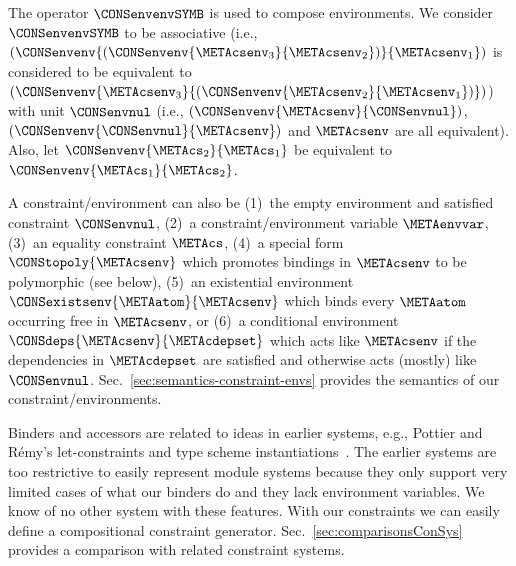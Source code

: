 \documentclass{jfp1}
\begin{document}
The operator $\CONSenvenvSYMB$ is used to compose environments.  We
consider $\CONSenvenvSYMB$ to be associative (i.e.,
$(\CONSenvenv{(\CONSenvenv{\METAcsenv_3}{\METAcsenv_2})}{\METAcsenv_1})$
is considered to be equivalent to
$(\CONSenvenv{\METAcsenv_3}{(\CONSenvenv{\METAcsenv_2}{\METAcsenv_1})})$)
with unit $\CONSenvnul$ (i.e.,
$(\CONSenvenv{\METAcsenv}{\CONSenvnul})$,
$(\CONSenvenv{\CONSenvnul}{\METAcsenv})$ and $\METAcsenv$ are all
equivalent).
Also, let $\CONSenvenv{\METAcs_2}{\METAcs_1}$ be equivalent to
$\CONSenvenv{\METAcs_1}{\METAcs_2}$.


A constraint/environment can also be (1)~the empty environment and
satisfied constraint $\CONSenvnul$, (2)~a constraint/environment
variable $\METAenvvar$, (3)~an equality constraint $\METAcs$, (4)~a
special form $\CONStopoly{\METAcsenv}$ which promotes bindings in
$\METAcsenv$ to be polymorphic (see below),
(5)~an existential environment $\CONSexistsenv{\METAatom}{\METAcsenv}$
which binds every $\METAatom$ occurring free in $\METAcsenv$,
or (6)~a conditional environment $\CONSdeps{\METAcsenv}{\METAcdepset}$
which acts like $\METAcsenv$ if the dependencies in $\METAcdepset$ are
satisfied and otherwise acts (mostly) like $\CONSenvnul$.
%
Sec.~\ref{sec:semantics-constraint-envs} provides the semantics of our
constraint/environments.

Binders and accessors are related to ideas in earlier systems, e.g.,
Pottier and R\'{e}my's let-constraints and type scheme
instantiations~\cite{Pottier+Remy:2005}.
The earlier systems are too restrictive to easily represent module
systems because they only support very limited cases of what our
binders do and they lack environment variables.
We know of no other system with these features.
With our constraints we can easily define a
compositional constraint generator.
Sec.~\ref{sec:comparisonsConSys} provides a comparison with related
constraint systems.
\end{document}

